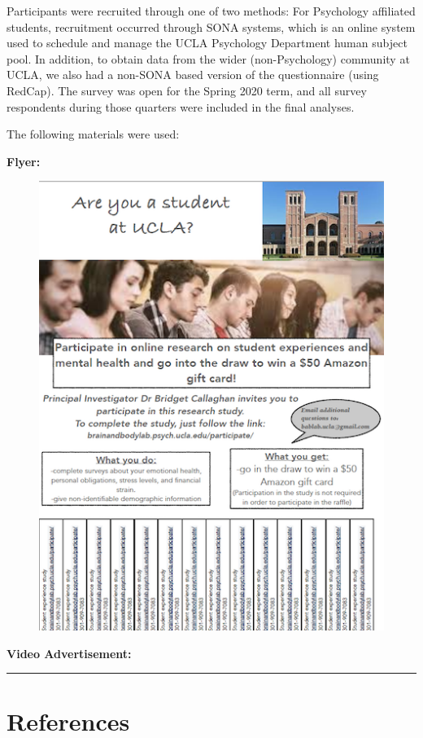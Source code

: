 \documentclass[]{book}
\begin{document}
Participants were recruited through one of two methods: For Psychology affiliated students, recruitment occurred through SONA systems, which is an online system used to schedule and manage the UCLA Psychology Department human subject pool. In addition, to obtain data from the wider (non-Psychology) community at UCLA, we also had a non-SONA based version of the questionnaire (using RedCap). The survey was open for the Spring 2020 term, and all survey respondents during those quarters were included in the final analyses.

The following materials were used:

\textbf{Flyer:}

\begin{figure}
\centering
\includegraphics{images/tmh_flyer.png}
\caption{}
\end{figure}

\textbf{Video Advertisement:}

\begin{center}\rule{0.5\linewidth}{0.5pt}\end{center}

\hypertarget{references}{%
\chapter{References}\label{references}}
\end{document}
